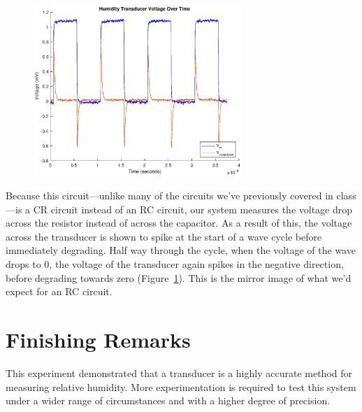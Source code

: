 \documentclass[11pt]{article}
\begin{document}
\begin{figure}[H]
	\centering 
	\includegraphics[width=0.7\textwidth]{voltage.eps}
	\caption{}
	\label{fig:voltage}
\end{figure}

Because this circuit—unlike many of the circuits we've previously covered in class—is a CR circuit instead of an RC circuit, our system measures the voltage drop across the resistor instead of across the capacitor. As a result of this, the voltage across the transducer is shown to spike at the start of a wave cycle before immediately degrading. Half way through the cycle, when the voltage of the wave drops to 0, the voltage of the transducer again spikes in the negative direction, before degrading towards zero (Figure~\ref{fig:voltage}). This is the mirror image of what we'd expect for an RC circuit.

\section{Finishing Remarks}
This experiment demonstrated that a transducer is a highly accurate method for measuring relative humidity. More experimentation is required to test this system under a wider range of circumstances and with a higher degree of precision.
\end{document}
